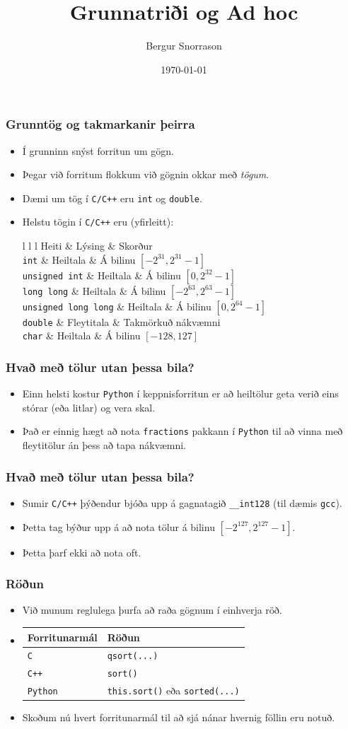 \documentclass{beamer}
\title{Grunnatriði og Ad hoc}
\author{Bergur Snorrason}
\date{\today}
\newcommand\env[2]
{
	\begin{#1}
	#2
	\end{#1}
}
\newcommand\code[1]{\tiny}
\begin{document}
\frame{\titlepage}

\env{frame}
{
	\frametitle{Grunntög og takmarkanir þeirra}
	\env{itemize}
	{
		\item<1-> Í grunninn snýst forritun um gögn.
		\item<2-> Þegar við forritum flokkum við gögnin okkar með \emph{tögum}.
		\item<3-> Dæmi um tög í \texttt{C/C++} eru \texttt{int} og \texttt{double}.
		\item<4-> Helstu tögin í \texttt{C/C++} eru (yfirleitt):
		\env{tabular}
		{
			{l l l}
			Heiti & Lýsing & Skorður\\
			\texttt{int} & Heiltala & Á bilinu $[-2^{31}, 2^{31} - 1]$\\
			\texttt{unsigned int} & Heiltala & Á bilinu $[0, 2^{32} - 1]$\\
			\texttt{long long} & Heiltala & Á bilinu $[-2^{63}, 2^{63} - 1]$\\
			\texttt{unsigned long long} & Heiltala & Á bilinu $[0, 2^{64} - 1]$\\
			\texttt{double} & Fleytitala & Takmörkuð nákvæmni\\
			\texttt{char} & Heiltala & Á bilinu $[-128, 127]$\\
		}
	}
}

\env{frame}
{
	\frametitle{Hvað með tölur utan þessa bila?}
	\env{itemize}
	{
		\item<1-> Einn helsti kostur \texttt{Python} í keppnisforritun er að heiltölur geta verið eins stórar (eða litlar) og vera skal.
		\pause \code{fact.py}
		\pause \code{fact.out}
		\item<4-> Það er einnig hægt að nota \texttt{fractions} pakkann í \texttt{Python} til að vinna með fleytitölur án þess að tapa nákvæmni.
	}
}

\env{frame}
{
	\frametitle{Hvað með tölur utan þessa bila?}
	\env{itemize}
	{
		\item<1-> Sumir \texttt{C/C++} þýðendur bjóða upp á gagnatagið \texttt{\_\_int128} (til dæmis \texttt{gcc}).
		\item<2-> Þetta tag býður upp á að nota tölur á bilinu $[-2^{127}, 2^{127} - 1]$.
		\item<3-> Þetta þarf ekki að nota oft.
	}
}

\env{frame}
{
	\frametitle{Röðun}
	\env{itemize}
	{
		\item<1-> Við munum reglulega þurfa að raða gögnum í einhverja röð.
		\item<2-> 
		\pause
		\begin{tabular}{l l}
			Forritunarmál & Röðun\\
			\hline
			\texttt{C} & \texttt{qsort(...)}\\
			\texttt{C++} & \texttt{sort()}\\
			\texttt{Python} & \texttt{this.sort()} eða \texttt{sorted(...)}\\
		\end{tabular}
		\item<3-> Skoðum nú hvert forritunarmál til að sjá nánar hvernig föllin eru notuð.
	}
}
\end{document}
